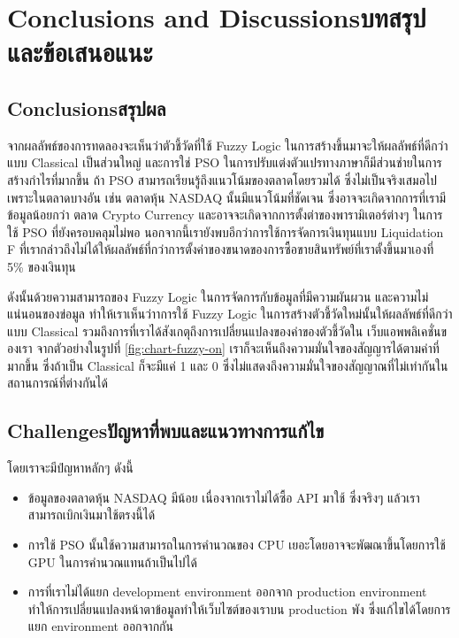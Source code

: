 \chapter{\ifenglish Conclusions and Discussions\else บทสรุปและข้อเสนอแนะ\fi}

\section{\ifenglish Conclusions\else สรุปผล\fi}


จากผลลัพธ์ของการทดลองจะเห็นว่าตัวชี้วัดที่ใช้ Fuzzy Logic ในการสร้างขึ้นมาจะให้ผลลัพธ์ที่ดีกว่าแบบ Classical เป็นส่วนใหญ่ และการใช่ PSO ในการปรับแต่งตัวแปรทางภาษาก็มีส่วนช่ายในการสร้างกำไรที่มากขึ้น ถ้า PSO สามารถเรียนรู้ถึงแนวโน้มของตลาดโดยรวมได้ ซึ่งไม่เป็นจริงเสมอไป เพราะในตลาดบางอัน เช่น ตลาดหุ้น NASDAQ นั้นมีแนวโน้มที่ชัดเจน ซึ่งอาจจะเกิดจากการที่เรามีข้อมูลน้อยกว่า ตลาด Crypto Currency และอาจจะเกิดจากการตั้งต่าของพารามิเตอร์ต่างๆ ในการใช้ PSO ที่ยังครอบคลุมไม่พอ นอกจากนี้เรายังพบอีกว่าการใช้การจัดการเงินทุนแบบ Liquidation F ที่เรากล่าวถึงไม่ได้ให้ผลลัพธ์ที่กว่าการตั้งค่าของขนาดของการซื้อขายสินทรัพย์ที่เราตั้งขึ้นมาเองที่ 5\% ของเงินทุน 

ดังนั้นด้วยความสามารถของ Fuzzy Logic ในการจัดการกับข้อมูลที่มีความผันผวน และความไม่แน่นอนของข่อมูล ทำให้เราเห็นว่าาการใช้ Fuzzy
Logic ในการสร้างตัวชี้วัดใหม่นั้นให้ผลลัพธ์ที่ดีกว่าแบบ Classical รวมถึงการที่เราได้สังเกตุถึงการเปลี่ยนแปลงของค่าของตัวชี้วัดใน เว็บแอพพลิเคชั่นของเรา จากตัวอย่างในรูปที่ \ref{fig:chart-fuzzy-on} เราก็จะเห็นถึงความมั่นใจของสัญญารได้ตามค่าที่มากขึ้น ซึ่งถ้าเป็น Classical ก็จะมีแค่ 1 และ 0 ซึ่งไม่แสดงถึงความมั่นใจของสัญญาณที่ไม่เท่ากันในสถานการณ์ที่ต่างกันได้

\section{\ifenglish Challenges\else ปัญหาที่พบและแนวทางการแก้ไข\fi}
โดยเราจะมีปํญหาหลักๆ ดังนี้
\begin{itemize}
    \item ข้อมูลของตลาดหุ้น NASDAQ มีน้อย เนื่องจากเราไม่ได้ซื้อ API มาใช้ ซึ่งจริงๆ แล้วเราสามารถเบิกเงินมาใช้ตรงนี้ได้
    \item การใช้ PSO นั้นใช้ความสามารถในการคำนวณของ CPU เยอะโดยอาจจะพัฒณาขึ้นโดยการใช้ GPU ในการคำนวณแทนถ้าเป็นไปได้
    \item การที่เราไม่ได้แยก development environment ออกจาก production environment ทำให้การเปลี่ยนแปลงหน้าตาข้อมูลทำให้เว็บไซต์ของเราบน production พัง ซึ่งแก้ไขได้โดยการแยก environment ออกจากกัน
\end{itemize}

